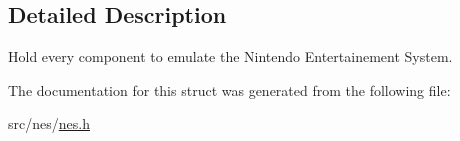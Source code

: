 \subsection{Detailed Description}
Hold every component to emulate the Nintendo Entertainement System. 

The documentation for this struct was generated from the following file\+:\begin{DoxyCompactItemize}
\item 
src/nes/\hyperlink{nes_8h}{nes.\+h}\end{DoxyCompactItemize}
